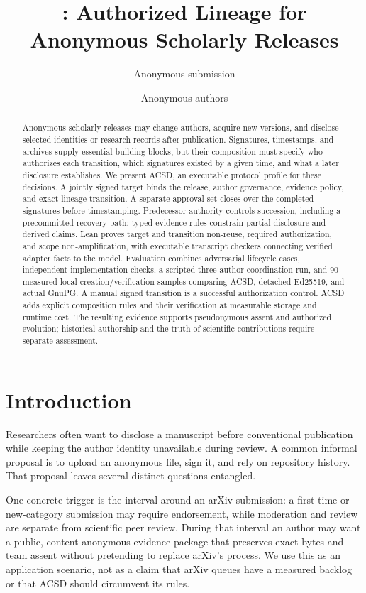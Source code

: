 \documentclass[conference,compsoc]{IEEEtran}
\title{\acsd: Authorized Lineage for Anonymous Scholarly Releases}
\author{Anonymous submission}
\author{Anonymous authors}
\date{}
\newcommand{\acsd}{\textsc{ACSD}}
\begin{document}
\maketitle

\begin{abstract}
Anonymous scholarly releases may change authors, acquire new versions, and
disclose selected identities or research records after publication. Signatures,
timestamps, and archives supply essential building blocks, but their composition
must specify who authorizes each transition, which signatures existed by a
given time, and what a later disclosure establishes. We present \acsd, an
executable protocol profile for these decisions. A jointly signed target binds
the release, author governance, evidence policy, and exact lineage transition.
A separate approval set closes over the completed signatures before timestamping.
Predecessor authority controls succession, including a precommitted recovery
path; typed evidence rules constrain partial disclosure and derived claims.
Lean proves target and transition non-reuse, required authorization, and scope
non-amplification, with executable transcript checkers connecting verified
adapter facts to the model. Evaluation combines adversarial lifecycle cases,
independent implementation checks, a scripted three-author coordination run,
and 90 measured local creation/verification samples comparing ACSD, detached
Ed25519, and actual GnuPG. A manual signed
transition is a successful authorization control. ACSD adds explicit composition
rules and their verification at measurable storage and runtime cost.
The resulting evidence supports pseudonymous assent and authorized evolution;
historical authorship and the truth of scientific contributions require
separate assessment.
\end{abstract}

\section{Introduction}

Researchers often want to disclose a manuscript before conventional publication while keeping the author identity unavailable during review. A common informal proposal is to upload an anonymous file, sign it, and rely on repository history. That proposal leaves several distinct questions entangled.

One concrete trigger is the interval around an arXiv submission: a first-time or
new-category submission may require endorsement, while moderation and review
are separate from scientific peer review. During that interval an author may
want a public, content-anonymous evidence package that preserves exact bytes
and team assent without pretending to replace arXiv's process. We use this as
an application scenario, not as a claim that arXiv queues have a measured
backlog or that ACSD should circumvent its rules.
\end{document}
